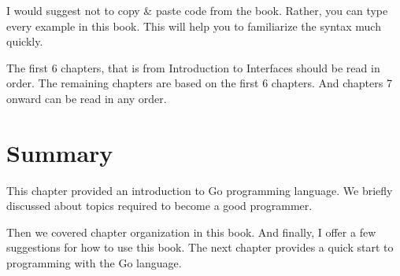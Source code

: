 I would suggest not to copy \& paste code from the book. Rather, you can type
every example in this book. This will help you to familiarize the syntax much
quickly.

The first 6 chapters, that is from Introduction to Interfaces should be read in
order. The remaining chapters are based on the first 6 chapters. And chapters 7
onward can be read in any order.

\section*{Summary}

This chapter provided an introduction to Go programming language. We briefly
discussed about topics required to become a good programmer.

Then we covered chapter organization in this book. And finally, I offer a few
suggestions for how to use this book. The next chapter provides a quick start to
programming with the Go language.
